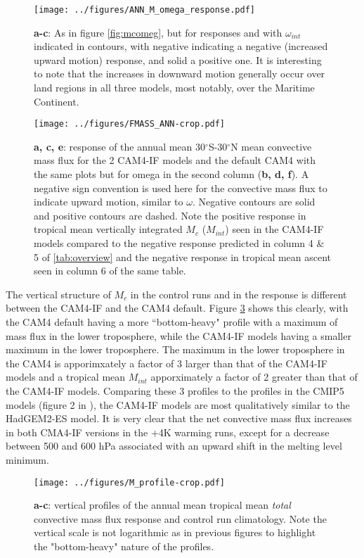 \documentclass[letterpaper,12pt,titlepage,oneside,final]{book}
\begin{document}
\begin{figure}[H]
\centering
\noindent\texttt{[image: ../figures/ANN\_M\_omega\_response.pdf]}\hfill
\caption{\textbf{a-c}: As in figure \ref{fig:mcomeg}, but for responses and with $\omega_{int}$ indicated in contours, with negative indicating a negative (increased upward motion) response, and solid a positive one. It is interesting to note that the increases in downward motion generally occur over land regions in all three models, most notably, over the Maritime Continent.}
\label{fig:mcomegres}
\end{figure}
\begin{figure}[H]
\centering
\noindent\texttt{[image: ../figures/FMASS\_ANN-crop.pdf]}\hfill
\caption{\textbf{a, c, e}: response of the annual mean 30$^\circ$S-30$^\circ$N mean convective mass flux for the 2 CAM4-IF models and the default CAM4 with the same plots but for omega in the second column (\textbf{b, d, f}). A negative sign convention is used here for the convective mass flux to indicate upward motion, similar to $\omega$. Negative contours are solid and positive contours are dashed. Note the positive response in tropical mean vertically integrated $M_c$ ($M_{int}$) seen in the CAM4-IF models compared to the negative response predicted in column 4 \& 5 of \ref{tab:overview} and the negative response in tropical mean ascent seen in column 6 of the same table. }
\label{fig:Mc}
\end{figure}
The vertical structure of $M_{c}$ in the control runs and in the response is different between the CAM4-IF and the CAM4 default. Figure \ref{fig:mprofs} shows this clearly, with the CAM4 default having a more ``bottom-heavy" profile with a maximum of mass flux in the lower troposphere, while the CAM4-IF models having a smaller maximum in the lower troposphere. The maximum in the lower troposphere in the CAM4 is apporimxately a factor of 3 larger than that of the CAM4-IF models and a tropical mean $M_{int}$ apporximately a factor of 2 greater than that of the CAM4-IF models. Comparing these 3 profiles to the profiles in the CMIP5 models (figure 2 in \cite{chadwick_spatial_2012}), the CAM4-IF models are most qualitatively similar to the HadGEM2-ES model. It is very clear that the net convective mass flux increases in both CMA4-IF versions in the +4K warming runs, except for a decrease between 500 and 600 hPa associated with an upward shift in the melting level minimum.
\begin{figure}[H]
\centering
\noindent\texttt{[image: ../figures/M\_profile-crop.pdf]}\hfill
\caption{\textbf{a-c}: vertical profiles of the annual mean tropical mean \textit{total} convective mass flux response and control run climatology. Note the vertical scale is not logarithmic as in previous figures to highlight the "bottom-heavy" nature of the profiles.}
\label{fig:mprofs}
\end{figure}
\end{document}
